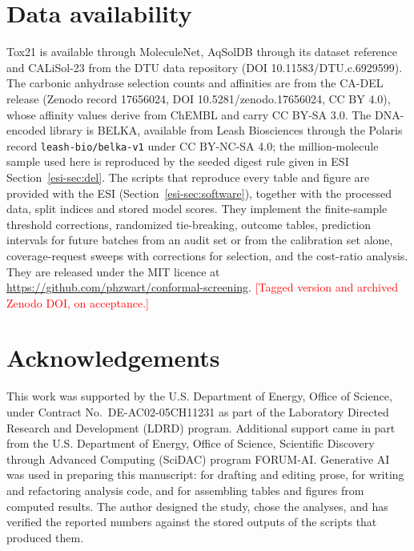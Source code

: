 \documentclass[twocolumn,10pt]{article}
\newcommand{\todo}[1]{\textcolor{red}{[#1]}}
\begin{document}
\section*{Data availability}
Tox21 is available through MoleculeNet, AqSolDB through its dataset reference\citep{Sorkun2019AqSolDB} and CALiSol-23 from the DTU data repository (DOI 10.11583/DTU.c.6929599).\citep{deBlasio2024CALiSol} The carbonic anhydrase selection counts and affinities are from the CA-DEL release\citep{He2026CADEL} (Zenodo record 17656024, DOI 10.5281/zenodo.17656024, CC BY 4.0), whose affinity values derive from ChEMBL\citep{Zdrazil2024ChEMBL} and carry CC BY-SA 3.0. The DNA-encoded library is BELKA,\citep{Quigley2024BELKA} available from Leash Biosciences through the Polaris record \texttt{leash-bio/belka-v1} under CC BY-NC-SA 4.0; the million-molecule sample used here is reproduced by the seeded digest rule given in ESI Section~\ref{esi-sec:del}. The scripts that reproduce every table and figure are provided with the ESI (Section~\ref{esi-sec:software}), together with the processed data, split indices and stored model scores. They implement the finite-sample threshold corrections, randomized tie-breaking, outcome tables, prediction intervals for future batches from an audit set or from the calibration set alone, coverage-request sweeps with corrections for selection, and the cost-ratio analysis. They are released under the MIT licence at \url{https://github.com/phzwart/conformal-screening}. \todo{Tagged version and archived Zenodo DOI, on acceptance.}

\section*{Acknowledgements}
This work was supported by the U.S. Department of Energy, Office of Science, under Contract No.\ DE-AC02-05CH11231 as part of the Laboratory Directed Research and Development (LDRD) program. Additional support came in part from the U.S. Department of Energy, Office of Science, Scientific Discovery through Advanced Computing (SciDAC) program FORUM-AI. Generative AI was used in preparing this manuscript: for drafting and editing prose, for writing and refactoring analysis code, and for assembling tables and figures from computed results. The author designed the study, chose the analyses, and has verified the reported numbers against the stored outputs of the scripts that produced them.

\small


\end{document}
